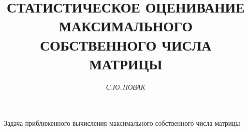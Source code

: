 

 




 


\newcommand{\col}{\operatorname{col}} 


\newcommand{\const}{\operatorname{const}} 








 


\setcounter{page}{49} 








\author{\it С.Ю.\,НОВАК} 


\title{СТАТИСТИЧЕСКОЕ ОЦЕНИВАНИЕ МАКСИМАЛЬНОГО\\ 


СОБСТВЕННОГО ЧИСЛА МАТРИЦЫ} 


 


\date{} 


\pagestyle{plain} 


 


 


\maketitle 


 




 


 


 


Задача приближенного вычисления максимального собственного числа матрицы 


